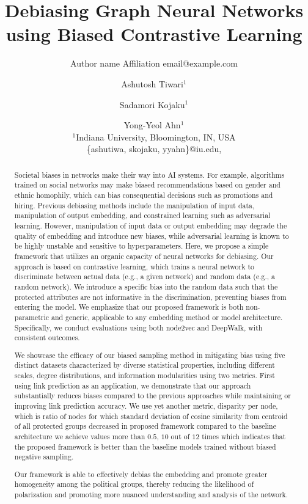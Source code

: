 \documentclass{article}
\title{Debiasing Graph Neural Networks using Biased Contrastive Learning}
\author{%
    Author name
    \affiliations
    Affiliation
    \emails
    email@example.com    %
}
\author{%
Ashutosh Tiwari$^1$\and
Sadamori Kojaku$^1$\and
Yong-Yeol Ahn$^{1}$\\
\affiliations
$^1$Indiana University, Bloomington, IN, USA\\
\emails
\{ashutiwa, skojaku, yyahn\}@iu.edu,
}
\begin{document}
\maketitle

\begin{abstract}
 Societal biases in networks make their way into AI systems. For example, algorithms trained on social networks may make biased recommendations based on gender and ethnic homophily, which can bias consequential decisions such as promotions and hiring. Previous debiasing methods include the manipulation of input data, manipulation of output embedding, and constrained learning such as adversarial learning. However, manipulation of input data or output embedding may degrade the quality of embedding and introduce new biases, while adversarial learning is known to be highly unstable and sensitive to hyperparameters. Here, we propose a simple framework that utilizes an organic capacity of neural networks for debiasing. Our approach is based on contrastive learning, which trains a neural network to discriminate between actual data (e.g., a given network) and random data (e.g., a random network). We introduce a specific bias into the random data such that the protected attributes are not informative in the discrimination, preventing biases from entering the model. We emphasize that our proposed framework is both non-parametric and generic, applicable to any embedding method or model architecture. Specifically, we conduct evaluations using both node2vec and DeepWalk, with consistent outcomes.

We showcase the efficacy of our biased sampling method in mitigating bias using five distinct datasets characterized by diverse statistical properties, including different scales, degree distributions, and information modularities using two metrics. First using link prediction as an application, we demonstrate that our approach substantially reduces biases compared to the previous approaches while maintaining or improving link prediction accuracy. We use yet another metric, disparity per node, which is ratio of nodes for which standard deviation of cosine similarity from centroid of all protected groups decreased in proposed framework compared to the baseline architecture we achieve values more than $0.5$, $10$ out of $12$ times which indicates that the proposed framework is better than the baseline models trained without biased negative sampling.


Our framework is able to effectively debias the embedding and promote greater homogeneity among the political groups, thereby reducing the likelihood of polarization and promoting more nuanced understanding and analysis of the network.
\end{abstract}
\end{document}
